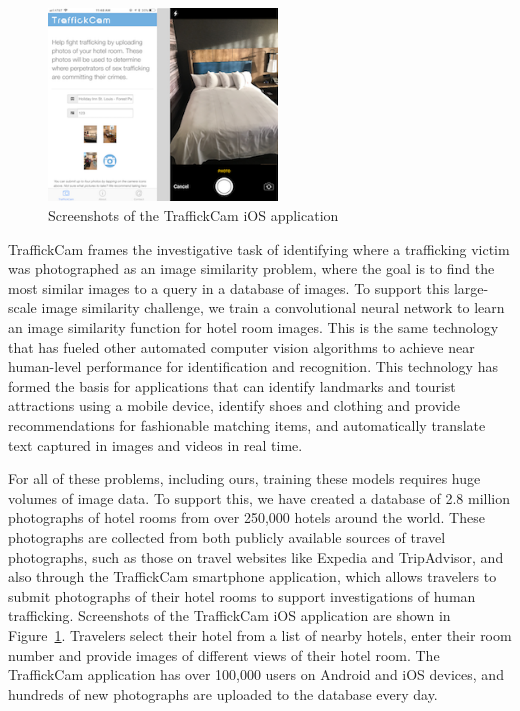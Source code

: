 \documentclass[12pt]{article}
\begin{document}
\begin{figure}
    \centering
    \includegraphics[width=2.4in]{figs/appScreenshotsCrop.png}
    \caption{Screenshots of the TraffickCam iOS application}
    \label{fig:tcamScreenshots}
\end{figure}

TraffickCam frames the investigative task of identifying where a trafficking victim was photographed as an image similarity problem, where the goal is to find the most similar images to a query in a database of images. To support this large-scale image similarity challenge, we train a convolutional neural network to learn an image similarity function for hotel room images. This is the same technology that has fueled other automated computer vision algorithms to achieve near human-level performance for identification and recognition. This technology has formed the basis for applications that can identify landmarks and tourist attractions using a mobile device, identify shoes and clothing and provide recommendations for fashionable matching items, and automatically translate text captured in images and videos in real time. 

For all of these problems, including ours, training these models requires huge volumes of image data. To support this, we have created a database of 2.8 million photographs of hotel rooms from over 250,000 hotels around the world. These photographs are collected from both publicly available sources of travel photographs, such as those on travel websites like Expedia and TripAdvisor, and also through the TraffickCam smartphone application, which allows travelers to submit photographs of their hotel rooms to support investigations of human trafficking. Screenshots of the TraffickCam iOS application are shown in Figure~\ref{fig:tcamScreenshots}. Travelers select their hotel from a list of nearby hotels, enter their room number and provide images of different views of their hotel room. The TraffickCam application has over 100,000 users on Android and iOS devices, and hundreds of new photographs are uploaded to the database every day.
\end{document}
